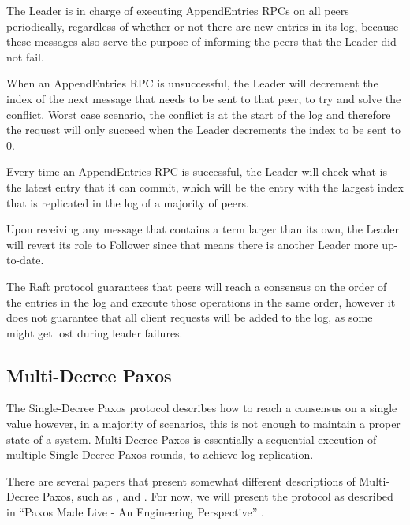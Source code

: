 \vspace{0.5cm}

The Leader is in charge of executing AppendEntries RPCs on all peers periodically, regardless of whether or not there are new entries in its log, because these messages also serve the purpose of informing the peers that the Leader did not fail.

When an AppendEntries RPC is unsuccessful, the Leader will decrement the index of the next message that needs to be sent to that peer, to try and solve the conflict. Worst case scenario, the conflict is at the start of the log and therefore the request will only succeed when the Leader decrements the index to be sent to 0.

Every time an AppendEntries RPC is successful, the Leader will check what is the latest entry that it can commit, which will be the entry with the largest index that is replicated in the log of a majority of peers.

Upon receiving any message that contains a term larger than its own, the Leader will revert its role to Follower since that means there is another Leader more up-to-date.

\vspace{0.5cm}

The Raft protocol guarantees that peers will reach a consensus on the order of the entries in the log and execute those operations in the same order, however it does not guarantee that all client requests will be added to the log, as some might get lost during leader failures.



\subsection{Multi-Decree Paxos}

The Single-Decree Paxos protocol describes how to reach a consensus on a single value however, in a majority of scenarios, this is not enough to maintain a proper state of a system. Multi-Decree Paxos is essentially a sequential execution of multiple Single-Decree Paxos rounds, to achieve log replication. 

There are several papers that present somewhat different descriptions of Multi-Decree Paxos, such as \cite{paxos_comple}, \cite{paxos_live} and \cite{paxos_vs_raft}. For now, we will present the protocol as described in “Paxos Made Live - An Engineering Perspective” \cite{paxos_live}.

